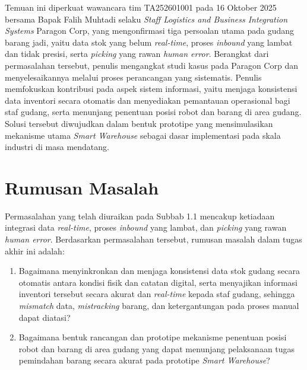Temuan ini diperkuat wawancara tim TA252601001 pada 16 Oktober 2025 bersama Bapak Falih Muhtadi selaku \textit{Staff Logistics and Business Integration Systems} Paragon Corp, yang mengonfirmasi tiga persoalan utama pada gudang barang jadi, yaitu data stok yang belum \textit{real-time}, proses \textit{inbound} yang lambat dan tidak presisi, serta \textit{picking} yang rawan \textit{human error}. Berangkat dari permasalahan tersebut, penulis mengangkat studi kasus pada Paragon Corp dan menyelesaikannya melalui proses perancangan yang sistematis. Penulis memfokuskan kontribusi pada aspek sistem informasi, yaitu menjaga konsistensi data inventori secara otomatis dan menyediakan pemantauan operasional bagi staf gudang, serta menunjang penentuan posisi robot dan barang di area gudang. Solusi tersebut diwujudkan dalam bentuk prototipe yang mensimulasikan mekanisme utama \textit{Smart Warehouse} sebagai dasar implementasi pada skala industri di masa mendatang.

\section{Rumusan Masalah}
Permasalahan yang telah diuraikan pada Subbab 1.1 mencakup ketiadaan integrasi data \textit{real-time}, proses \textit{inbound} yang lambat, dan \textit{picking} yang rawan \textit{human error}. Berdasarkan permasalahan tersebut, rumusan masalah dalam tugas akhir ini adalah:
\begin{enumerate}
\item Bagaimana menyinkronkan dan menjaga konsistensi data stok gudang secara otomatis antara kondisi fisik dan catatan digital, serta menyajikan informasi inventori tersebut secara akurat dan \textit{real-time} kepada staf gudang, sehingga \textit{mismatch} data, \textit{mistracking} barang, dan ketergantungan pada proses manual dapat diatasi?
\item Bagaimana bentuk rancangan dan prototipe mekanisme penentuan posisi robot dan barang di area gudang yang dapat menunjang pelaksanaan tugas pemindahan barang secara akurat pada prototipe \textit{Smart Warehouse}?
\end{enumerate}

